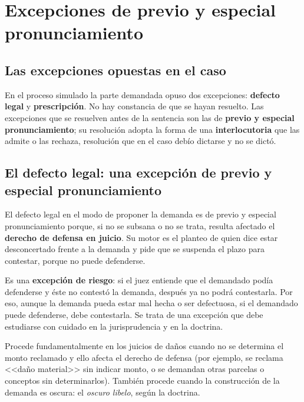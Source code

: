 \documentclass[12pt,oneside]{book}
\begin{document}

\section{Excepciones de previo y especial pronunciamiento}

\subsection{Las excepciones opuestas en el caso}

En el proceso simulado la parte demandada opuso dos excepciones: \textbf{defecto legal} y \textbf{prescripci\'on}. No hay constancia de que se hayan resuelto. Las excepciones que se resuelven antes de la sentencia son las de \textbf{previo y especial pronunciamiento}; su resoluci\'on adopta la forma de una \textbf{interlocutoria} que las admite o las rechaza, resoluci\'on que en el caso deb\'io dictarse y no se dict\'o.

\subsection{El defecto legal: una excepci\'on de previo y especial pronunciamiento}

El defecto legal en el modo de proponer la demanda es de previo y especial pronunciamiento porque, si no se subsana o no se trata, resulta afectado el \textbf{derecho de defensa en juicio}. Su motor es el planteo de quien dice estar desconcertado frente a la demanda y pide que se suspenda el plazo para contestar, porque no puede defenderse.

Es una \textbf{excepci\'on de riesgo}: si el juez entiende que el demandado pod\'ia defenderse y \'este no contest\'o la demanda, despu\'es ya no podr\'a contestarla. Por eso, aunque la demanda pueda estar mal hecha o ser defectuosa, si el demandado puede defenderse, debe contestarla. Se trata de una excepci\'on que debe estudiarse con cuidado en la jurisprudencia y en la doctrina.

Procede fundamentalmente en los juicios de da\~nos cuando no se determina el monto reclamado y ello afecta el derecho de defensa (por ejemplo, se reclama <<da\~no material>> sin indicar monto, o se demandan otras parcelas o conceptos sin determinarlos). Tambi\'en procede cuando la construcci\'on de la demanda es oscura: el \emph{oscuro libelo}, seg\'un la doctrina.
\end{document}
